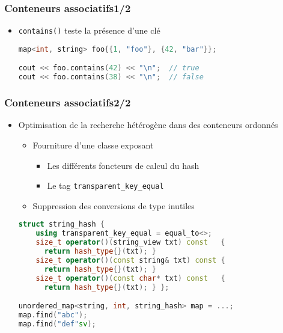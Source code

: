 \documentclass[C++.tex]{subfiles}
\begin{document}
\begin{frame}[fragile]
	\frametitle{Conteneurs associatifs\titlehfill{}1/2}
	\begin{itemize}
		\item \lstinline|contains()| teste la présence d'une clé


		\begin{lstlisting}[language=C++]
map<int, string> foo{{1, "foo"}, {42, "bar"}};

cout << foo.contains(42) << "\n";  // true
cout << foo.contains(38) << "\n";  // false\end{lstlisting}
	\end{itemize}
\end{frame}

\begin{frame}[fragile]
	\frametitle{Conteneurs associatifs\titlehfill{}2/2}
	\begin{itemize}
		\item Optimisation de la recherche hétérogène dans des conteneurs ordonnés
		\begin{itemize}
			\item Fourniture d'une classe exposant
			\begin{itemize}
				\item Les différents foncteurs de calcul du hash
				\item Le tag \lstinline|transparent_key_equal|
			\end{itemize}
			\item Suppression des conversions de type inutiles
		\end{itemize}

		\begin{lstlisting}[language=C++]
struct string_hash {
	using transparent_key_equal = equal_to<>;
	size_t operator()(string_view txt) const   { 
	  return hash_type{}(txt); }
	size_t operator()(const string& txt) const {
	  return hash_type{}(txt); }
	size_t operator()(const char* txt) const   {
	  return hash_type{}(txt); } };

unordered_map<string, int, string_hash> map = ...;
map.find("abc");
map.find("def"sv);\end{lstlisting}
	\end{itemize}
\end{frame}
\end{document}
